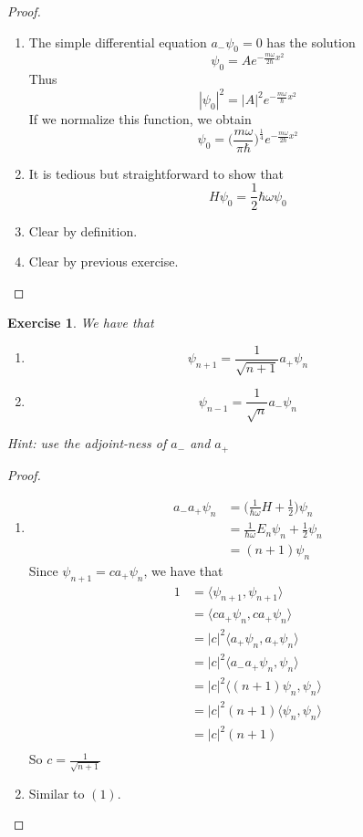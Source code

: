 \documentclass[12pt]{amsart}
\newtheorem{ex}[thm]{Exercise}
\renewcommand{\r}{\rangle}
\renewcommand{\l}{\langle}
\newcommand{\om}{\omega}
\begin{document}
\begin{proof}\
\begin{enumerate}
\item The simple differential equation $a_-\psi_0 = 0$ has the solution $$\psi_0 = Ae^{-\frac{m \om}{2 \hbar}x^2}$$ Thus $$| \psi_0|^2 = | A |^2 e^{-\frac{m \om}{ \hbar}x^2}$$ If we normalize this function, we obtain $$\psi_0= \bigg( \frac{m \om}{ \pi \hbar} \bigg)^{\frac{1}{4}} e^{-\frac{m \om}{2 \hbar}x^2}$$
\item It is tedious but straightforward to show that $$H\psi_0 = \frac{1}{2}\hbar \om\psi_0$$
\item Clear by definition.
\item Clear by previous exercise.
\end{enumerate} 
\end{proof}

\begin{ex} We have that
\begin{enumerate}
\item  $$\psi_{n+1} = \frac{1}{\sqrt{n+1}} a_+\psi_n $$
\item $$\psi_{n-1} = \frac{1}{\sqrt{n}} a_- \psi_n $$

\end{enumerate}
Hint: use the adjoint-ness of $a_-$ and $a_+$
\end{ex}

\begin{proof}\
\begin{enumerate}
\item 
\begin{align*}
a_-a_+\psi_n
&= \bigg(\frac{1}{\hbar \om}H +\frac{1}{2}\bigg)\psi_n\\
&= \frac{1}{\hbar \om}E_n \psi_n + \frac{1}{2} \psi_n\\
&= (n+1) \psi_n
\end{align*}
Since $\psi_{n+1} = ca_+\psi_{n}$, we have that
\begin{align*}
1
&=\l \psi_{n+1}, \psi_{n+1}\r\\
&=\l c a_+\psi_n , ca_+\psi_n\r\\
&= |c|^2 \l a_+ \psi_n, a_+ \psi_n \r\\
&= |c|^2 \l a_- a_+\psi_n , \psi_n \r\\
&= |c|^2 \l (n+1)\psi_n , \psi_n \r\\
&= |c|^2  (n+1) \l \psi_n , \psi_n \r\\
&= |c|^2  (n+1)\\
\end{align*}
So $c = \frac{1}{\sqrt{n+1}}$\vspace{2mm}

\item Similar to $(1)$.
\end{enumerate}
\end{proof}
\end{document}
